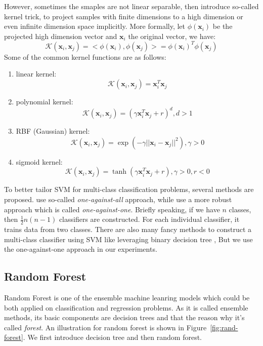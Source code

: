 \documentclass[sigconf]{acmart}
\newcommand{\bx}{\mathbf{x}}
\begin{document}
	However, sometimes the smaples are not linear separable, then \citet{cristianini1999introduction} introduce so-called kernel trick, to project samples with finite dimensions to a high dimension or even infinite dimension space implicitly. More formally, let $\phi(\mathbf{x}_i)$ be the projected high dimension vector and $\mathbf{x}_i$ the original vector, we have:
	\begin{equation}
	\mathcal{K}(\mathbf{x}_i,\mathbf{x}_j)=<\phi(\mathbf{x}_i),\phi(\mathbf{x}_j)>=\phi(\mathbf{x}_i)^T\phi(\mathbf{x}_j)
	\end{equation}
	Some of the common kernel functions are as follows:
	\begin{enumerate}
		\item linear kernel:
		\begin{equation}
		\mathcal{K}(\mathbf{x}_i,\bx_j)=\bx_i^T\bx_j
		\end{equation}
		
		\item polynomial kernel:
		\begin{equation}
		\mathcal{K}(\bx_i,\bx_j)=(\gamma \bx_i^T\bx_j + r)^d, d>1
		\end{equation}
		
		\item RBF (Gaussian) kernel:
		\begin{equation}
		\mathcal{K}(\bx_i,\bx_j)=\exp(-\gamma ||\bx_i-\bx_j||^2),\gamma>0
		\end{equation}
		
		\item sigmoid kernel:  
		\begin{equation}
		\mathcal{K}(\bx_i,\bx_j)=\tanh(\gamma \bx_i^T\bx_j + r ), \gamma>0, r<0
		\end{equation}
	\end{enumerate}
	
	To better tailor SVM for multi-class classification problems, several methods are proposed. \citet{liu2005one} use so-called \textit{one-against-all} approach, while \citet{knerr1990single} use a more robust approach which is called \textit{one-against-one}. Briefly speaking, if we have $n$ classes, then $\frac{1}{2}n(n-1)$ classifiers are constructed. For each individual classifier, it trains data from two classes. There are also many fancy methods to construct a multi-class classifier using SVM like leveraging binary decision tree \cite{madzarov2009multi}, But we use the one-against-one approach in our experiments.


	\subsection{Random Forest}
	Random Forest \cite{breiman2001random} is one of the ensemble machine leanring models \cite{zhou2012ensemble} which could be both applied on classification and regression problems. As it is called ensemble methods, its basic components are decision trees \cite{safavian1991survey} and that the reason why it's called \textit{forest}. An illustration for random forest is shown in Figure~\ref{fig:rand-forest}. We first introduce decision tree and then random forest. 
	
\end{document}
